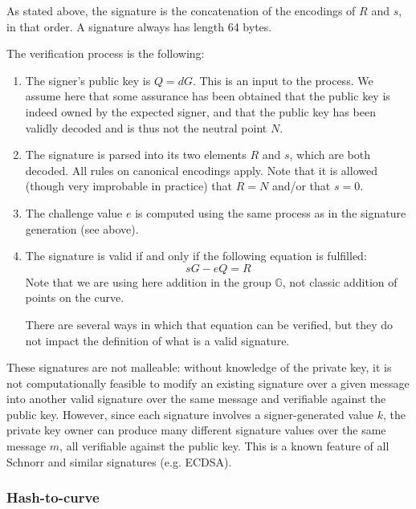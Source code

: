 \documentclass{llncs}
\newcommand{\bG}{\mathbb{G}}
\begin{document}
As stated above, the signature is the concatenation of the encodings of
$R$ and $s$, in that order. A signature always has length 64 bytes.

The verification process is the following:
\begin{enumerate}

    \item The signer's public key is $Q = dG$. This is an input to the
    process. We assume here that some assurance has been obtained that
    the public key is indeed owned by the expected signer, and that
    the public key has been validly decoded and is thus not the
    neutral point $N$.

    \item The signature is parsed into its two elements $R$ and $s$,
    which are both decoded. All rules on canonical encodings apply.
    Note that it is allowed (though very improbable in practice) that
    $R = N$ and/or that $s = 0$.

    \item The challenge value $e$ is computed using the same process as
    in the signature generation (see above).

    \item The signature is valid if and only if the following equation
    is fulfilled:
    \begin{equation*}
        sG - eQ = R
    \end{equation*}
    Note that we are using here addition in the group $\bG$, not
    classic addition of points on the curve.

    There are several ways in which that equation can be verified, but
    they do not impact the definition of what is a valid signature.

\end{enumerate}

These signatures are not malleable: without knowledge of the private
key, it is not computationally feasible to modify an existing signature
over a given message into another valid signature over the same message
and verifiable against the public key. However, since each signature
involves a signer-generated value $k$, the private key owner can produce
many different signature values over the same message $m$, all
verifiable against the public key. This is a known feature of all
Schnorr and similar signatures (e.g. ECDSA).

\subsubsection{Hash-to-curve}
\end{document}

